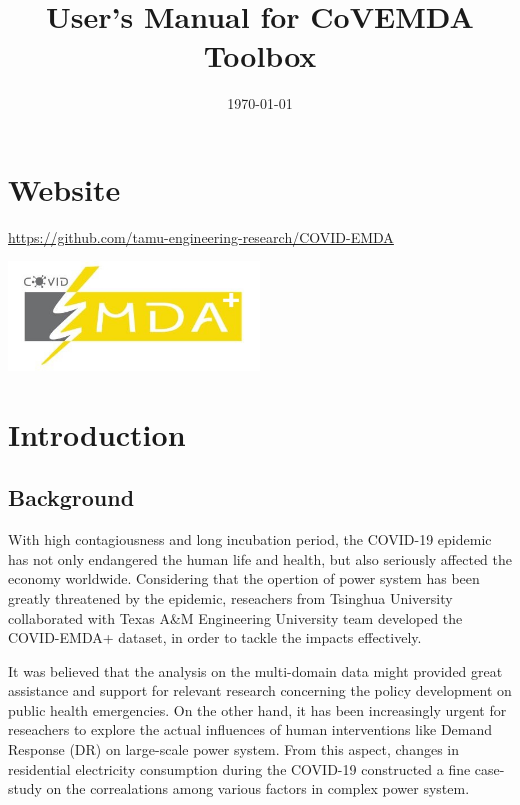 \documentclass[11pt]{article}
\title{User's Manual for CoVEMDA Toolbox}
\author{}
\date{\today}
\numberwithin{equation}{section}
\numberwithin{table}{section}
\numberwithin{figure}{section}
\begin{document}
\maketitle
\thispagestyle{empty}
\newpage
\tableofcontents
\thispagestyle{empty}


\newpage
\setcounter{page}{1}
\section*{Website}

\url{https://github.com/tamu-engineering-research/COVID-EMDA}

\begin{center}
	\noindent\includegraphics[width=0.5\textwidth]{figures/covid_emda_logo.JPG}
\end{center}



\newpage
\section{Introduction} \label{sec:intro}

\subsection{Background}

With high contagiousness and long incubation period, the COVID-19 epidemic has not only endangered the human life and health, but also seriously affected the economy worldwide. Considering that the opertion of power system has been greatly threatened by the epidemic, reseachers from Tsinghua University collaborated with Texas A\&M Engineering University team developed the COVID-EMDA+ dataset, in order to tackle the impacts effectively. 

It was believed that the analysis on the multi-domain data might provided great assistance and support for relevant research concerning the policy development on public health emergencies. On the other hand, it has been increasingly urgent for reseachers to explore the actual influences of human interventions like Demand Response (DR) on large-scale power system. From this aspect, changes in residential electricity consumption during the COVID-19 constructed a fine case-study on the correalations among various factors in complex power system.
\end{document}
